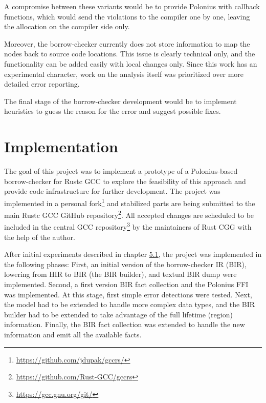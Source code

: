 \documentclass[
  11pt,
  twoside,symmetric]{report}
\DeclareRobustCommand{\href}[2]{#2\footnote{\url{#1}}}
\begin{document}
A compromise between these variants would be to provide Polonius with
callback functions, which would send the violations to the compiler one
by one, leaving the allocation on the compiler side only.

Moreover, the borrow-checker currently does not store information to map
the nodes back to source code locations. This issue is clearly technical
only, and the functionality can be added easily with local changes only.
Since this work has an experimental character, work on the analysis
itself was prioritized over more detailed error reporting.

The final stage of the borrow-checker development would be to implement
heuristics to guess the reason for the error and suggest possible fixes.

\hypertarget{implementation}{%
\chapter{Implementation}\label{implementation}}

The goal of this project was to implement a prototype of a
Polonius-based borrow-checker for Rustc GCC to explore the feasibility
of this approach and provide code infrastructure for further
development. The project was implemented in a
\href{https://github.com/jdupak/gccrs/}{personal fork} and stabilized
parts are being submitted to the main
\href{https://github.com/Rust-GCC/gccrs}{Rustc GCC GitHub repository}.
All accepted changes are scheduled to be included in the
\href{https://gcc.gnu.org/git/}{central GCC repository} by the
maintainers of Rust CGG with the help of the author.

After initial experiments described in chapter
\protect\hyperlink{analysis-of-the-fact-collection-problem}{5.1}, the
project was implemented in the following phases: First, an initial
version of the borrow-checker IR (BIR), lowering from HIR to BIR (the
BIR builder), and textual BIR dump were implemented. Second, a first
version BIR fact collection and the Polonius FFI was implemented. At
this stage, first simple error detections were tested. Next, the model
had to be extended to handle more complex data types, and the BIR
builder had to be extended to take advantage of the full lifetime
(region) information. Finally, the BIR fact collection was extended to
handle the new information and emit all the available facts.
\end{document}
